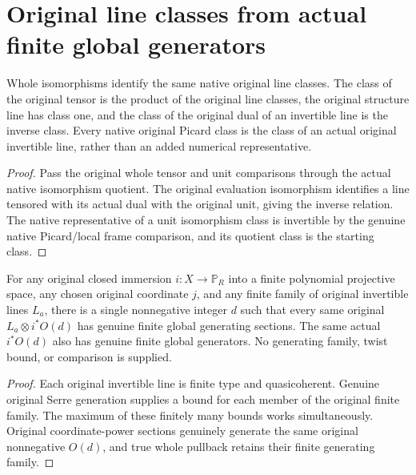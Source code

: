 \section{Original line classes from actual finite global generators}

\begin{lemma}
\label{lem:fc-original-line-picard-tensor-dual}
\leanok
{}
Whole isomorphisms identify the same native original line classes.
The class of the original tensor is the product of the original line
classes, the original structure line has class one, and the class of
the original dual of an invertible line is the inverse class.
Every native original Picard class is the class of an actual original
invertible line, rather than an added numerical representative.
\end{lemma}
\begin{proof}
Pass the original whole tensor and unit comparisons through the actual
native isomorphism quotient. The original evaluation isomorphism
identifies a line tensored with its actual dual with the original
unit, giving the inverse relation. The native representative of a unit
isomorphism class is invertible by the genuine native Picard/local
frame comparison, and its quotient class is the starting class.
\end{proof}

\begin{theorem}
\label{thm:fc-original-finite-line-family-generated-twist}
\leanok
{}
For any original closed immersion $i:X\to\mathbb P_R$ into a finite
polynomial projective space, any chosen original coordinate $j$, and
any finite family of original invertible lines $L_a$, there is a single
nonnegative integer $d$ such that every same original
$L_a\otimes i^*O(d)$ has genuine finite global generating sections.
The same actual $i^*O(d)$ also has genuine finite global generators.
No generating family, twist bound, or comparison is supplied.
\end{theorem}
\begin{proof}
Each original invertible line is finite type and quasicoherent.
Genuine original Serre generation supplies a bound for each member of
the original finite family. The maximum of these finitely many bounds
works simultaneously. Original coordinate-power sections genuinely
generate the same original nonnegative $O(d)$, and true whole
pullback retains their finite generating family.
\end{proof}

